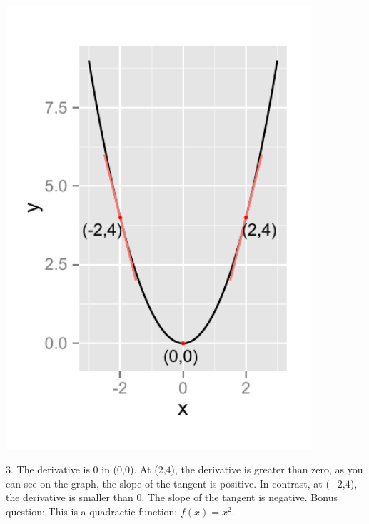\documentclass[a4paper]{report}
\begin{document}
\begin{Answer}[ref=ex0]
\begin{minipage}{\rat\textwidth}
\includegraphics[width=0.85\textwidth]{1ac.pdf}
\end{minipage}
\begin{minipage}{\rati\textwidth}
3. The derivative is $0$ in ($0$,$0$). At ($2$,$4$), the derivative is greater than zero, as you can see on the graph, the slope of the tangent is positive. In contrast, at ($-2$,$4$), the derivative is smaller than $0$. The slope of the tangent is negative. Bonus question: This is a quadractic function: $f(x)=x^2$. 
\end{minipage}


\end{Answer}
\end{document}
